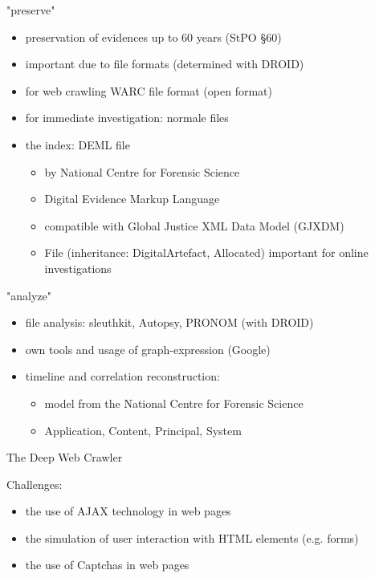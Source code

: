 \documentclass{beamer}
\begin{document}
\begin{frame}{"preserve"}

\begin{itemize}
  \item preservation of evidences up to 60 years (StPO \S60)
  \item important due to file formats (determined with DROID)
  \item for web crawling WARC file format (open format)
  \item for immediate investigation: normale files
  \item the index: DEML file
  \begin{itemize}
    \item by National Centre for Forensic Science
    \item Digital Evidence Markup Language
    \item compatible with Global Justice XML Data Model (GJXDM)
    \item File (inheritance: DigitalArtefact, Allocated) important for online investigations
  \end{itemize}
\end{itemize}

\end{frame}

\begin{frame}{"analyze"}

\begin{itemize}
  \item file analysis: sleuthkit, Autopsy, PRONOM (with DROID)
  \item own tools and usage of graph-expression (Google)
  \item timeline and correlation reconstruction:
  \begin{itemize}
  	\item model from the National Centre for Forensic Science
	\item Application, Content, Principal, System
  \end{itemize}
\end{itemize}

\end{frame}

\begin{frame}{The Deep Web Crawler}

Challenges:

\begin{itemize}
  \item the use of AJAX technology in web pages
  \item the simulation of user interaction with HTML elements (e.g. forms)
  \item the use of Captchas in web pages
\end{itemize}

\end{frame}
\end{document}
